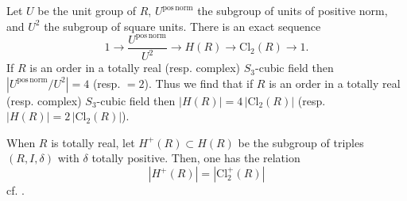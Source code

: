 \documentclass[table]{amsart}
\numberwithin{equation}{section}
\begin{document}
Let $U$ be the unit group of $R$, $U^{\mathrm{pos\,norm}}$ the subgroup of units
of positive norm, and $U^{2}$ the subgroup of square units. There is an exact
sequence
\[
1 \longrightarrow \frac{U^{\mathrm{pos\,norm}}}{U^{2}}
\longrightarrow H(R)
\longrightarrow \mathrm{Cl}_{2}(R)
\longrightarrow 1.
\]
If $R$ is an order in a totally real (resp. complex) $S_{3}$-cubic field then $|U^{\mathrm{pos\,norm}}/U^{2}|=4$ (resp. $=2$). Thus we find that if $R$ is an order in a totally real (resp. complex) $S_{3}$-cubic field then
$|H(R)|=4\,|\mathrm{Cl}_{2}(R)|$ (resp. $|H(R)|=2\,|\mathrm{Cl}_{2}(R)|$).

When $R$ is totally real, let $H^{+}(R)\subset H(R)$ be the subgroup of triples
$(R,I,\delta)$ with $\delta$ totally positive. Then, one has the relation
\[
|H^{+}(R)|=|\mathrm{Cl}_{2}^{+}(R)|
\]
cf. \cite[Lemma 15]{BhargavaVarma}.
\end{document}
